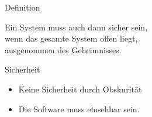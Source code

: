 \documentclass[aspectratio=1610]{beamer}
\begin{document}
  \begin{frame}{Definition}
    \begin{exampleblock}
      \large{Ein System muss auch dann sicher sein,\\wenn das gesamte System offen liegt,\\ausgenommen des Geheimnisses.}
      \vskip5mm
      \hspace*{}
    \end{exampleblock}
  \end{frame}

  \begin{frame}{Sicherheit}
    \begin{itemize}
      \pause
      \item Keine Sicherheit durch Obskurität
      \pause
      \item Die Software muss einsehbar sein.
      \pause
    \end{itemize}
  \end{frame}
\end{document}
